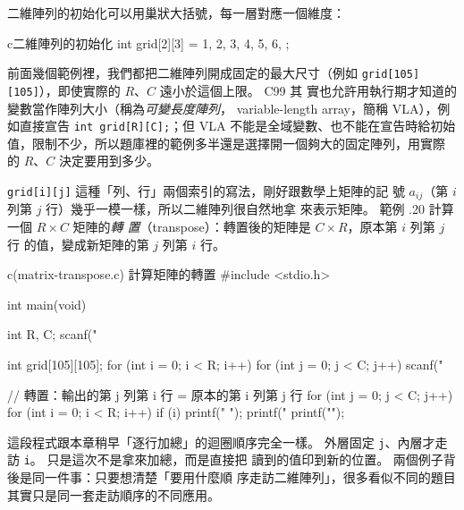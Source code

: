 二維陣列的初始化可以用巢狀大括號，每一層對應一個維度：

\begin{code}{c}{二維陣列的初始化}
int grid[2][3] = {
    {1, 2, 3},
    {4, 5, 6},
};
\end{code}

前面幾個範例裡，我們都把二維陣列開成固定的最大尺寸（例如
\texttt{grid[105][105]}），即使實際的 $R$、$C$ 遠小於這個上限。 C99 其
實也允許用執行期才知道的變數當作陣列大小（稱為\emph{可變長度陣列}，
variable-length array，簡稱 VLA），例如直接宣告
\texttt{int grid[R][C];}；但 VLA 不能是全域變數、也不能在宣告時給初始
值，限制不少，所以題庫裡的範例多半還是選擇開一個夠大的固定陣列，用實際
的 $R$、$C$ 決定要用到多少。

\texttt{grid[i][j]} 這種「列、行」兩個索引的寫法，剛好跟數學上矩陣的記
號 $a_{ij}$（第 $i$ 列第 $j$ 行）幾乎一模一樣，所以二維陣列很自然地拿
來表示矩陣。 範例 \thechapter.20 計算一個 $R \times C$ 矩陣的\emph{轉
置}（transpose）：轉置後的矩陣是 $C \times R$，原本第 $i$ 列第 $j$ 行
的值，變成新矩陣的第 $j$ 列第 $i$ 行。

\begin{example}{c}{(matrix-transpose.c) 計算矩陣的轉置}
#include <stdio.h>

int main(void) {
    int R, C;
    scanf("%

    int grid[105][105];
    for (int i = 0; i < R; i++) {
        for (int j = 0; j < C; j++) {
            scanf("%
        }
    }

    // 轉置：輸出的第 j 列第 i 行 = 原本的第 i 列第 j 行
    for (int j = 0; j < C; j++) {
        for (int i = 0; i < R; i++) {
            if (i) {
                printf(" ");
            }
            printf("%
        }
        printf("\n");
    }
}
\end{example}


這段程式跟本章稍早「逐行加總」的迴圈順序完全一樣。 外層固定
\texttt{j}、內層才走訪 \texttt{i}。 只是這次不是拿來加總，而是直接把
讀到的值印到新的位置。 兩個例子背後是同一件事：只要想清楚「要用什麼順
序走訪二維陣列」，很多看似不同的題目其實只是同一套走訪順序的不同應用。


